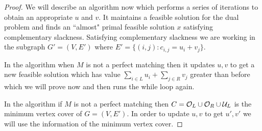 \begin{proof}
	We will describe an algorithm now which performs a series of iterations to obtain an appropriate $u$ and $v$. It maintains a feasible solution for the dual problem and finds an ``almost" primal feasible solution $x$ satisfying complementary slackness. Satisfying complementary slackness we are working in the subgraph $G'=(V,E')$ where $E'=\{(i,j)\colon c_{i,j}=u_i+v_j\}$.
	\begin{algorithm}\DontPrintSemicolon
		\caption{}
	\end{algorithm}
	
	In the algorithm when $M$ is not a perfect matching then it updates $u,v$ to get a new feasible solution which has value $\sum\limits_{i\in L}u_i+\sum\limits_{j\in R}v_j$ greater than before which we will prove now and then runs the while loop again.
	
	In the  algorithm if $M$ is not a perfect matching then $C=\mathcal{O}_L\cup \mathcal{O}_R\cup\mathcal{U}_L$ is the minimum vertex cover of $G=(V,E')$. In order to update $u,v$ to get $u',v'$ we will use the information of the minimum vertex cover. 
	

\end{proof}
